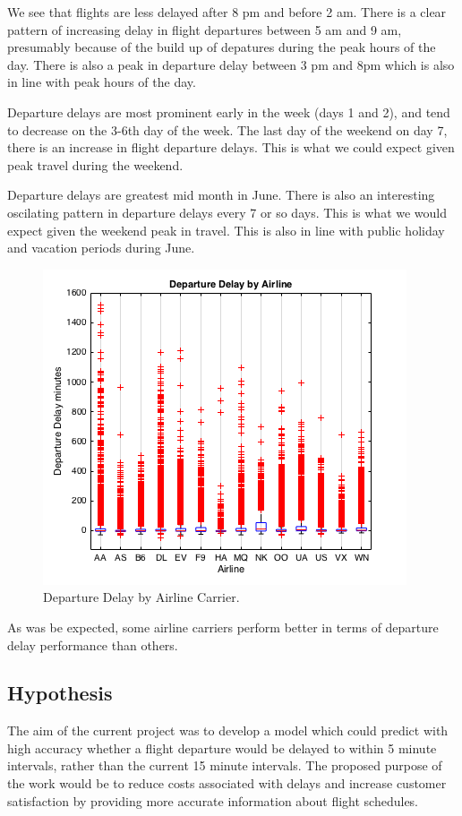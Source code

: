 \documentclass[a4paper, 11pt]{article}
\begin{document}
We see that flights are less delayed after 8 pm and before 2 am. There is a clear pattern of increasing delay in flight departures between 5 am and 9 am, presumably because of the build up of depatures during the peak hours of the day. There is also a peak in departure delay between 3 pm and 8pm which is also in line with peak hours of the day.

\vspace{5mm}
Departure delays are most prominent early in the week (days 1 and 2), and tend to decrease on the 3-6th day of the week. The last day of the weekend on day 7, there is an increase in flight departure delays. This is what we could expect given peak travel during the weekend.

\vspace{5mm}
Departure delays are greatest mid month in June. There is also an interesting oscilating pattern in departure delays every 7 or so days. This is what we would expect given the weekend peak in travel. This is also in line with public holiday and vacation periods during June.

\begin{figure}[H]
\begin{center}
\includegraphics[scale=0.5]{departureDelayByAirline}
\caption{Departure Delay by Airline Carrier.}
\label{departureDelayByAirline}
\end{center}
\end{figure}

As was be expected, some airline carriers perform better in terms of departure delay performance than others.



\subsection{Hypothesis}\label{hypothesis}
The aim of the current project was to develop a model which could predict with high accuracy whether a flight departure would be delayed to within 5 minute intervals, rather than the current 15 minute intervals. The proposed purpose of the work would be to reduce costs associated with delays and increase customer satisfaction by providing more accurate information about flight schedules. 
\end{document}
